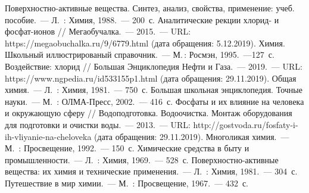 \begin{thebibliography}{99}
\bibitem{} Поверхностно-активные вещества. Синтез, анализ, свойства, применение: учеб. пособие.~--- Л.~: Химия, 1988.~--- 200~с.
\bibitem{}Аналитические рекции хлорид- и фосфат-ионов // Мегаобучалка.~--- 2015.~--- URL: https://megaobuchalka.ru/9/6779.html (дата обращения: 5.12.2019).
\bibitem{} Химия. Школьный иллюстрированый справочник.~--- М.\,: Росмэн, 1995.~---127~с.
\bibitem{}Воздействие: хлорид // Большая Энциклопедия Нефти и Газа.~--- 2019.~--- URL: https://www.ngpedia.ru/id533155p1.html (дата обращения: 29.11.2019).
\bibitem{} Общая химия.~--- Л.~: Химия, 1981.~--- 750~с.
\bibitem{} Большая школьная энциклопедия. Точные науки.~--- М.~: ОЛМА-Пресс, 2002.~--- 416~с.
\bibitem{}Фосфаты и их влияние на человека и окружающую сферу // Водоподготовка. Водоочистка. Монтаж оборудования для подготовки и очистки воды.~--- 2013.~--- URL: http://gostvoda.ru/fosfaty-i-ih-vliyanie-na-cheloveka (дата обращения: 29.11.2019).
\bibitem{} Многоликая химия.~--- М.~: Просвещение, 1992.~--- 150~с.
\bibitem{} Химические средства в быту и промышленности.~--- Л.~: Химия, 1969.~--- 528~с.
\bibitem{} Поверхностно-активные вещества: их химия и технические применения.~--- Л.~: Химия, 1981.~--- 304~с.
\bibitem{} Путешествие в мир химии.~--- М.~: Просвещение, 1967.~--- 432~с.
\end{thebibliography}
